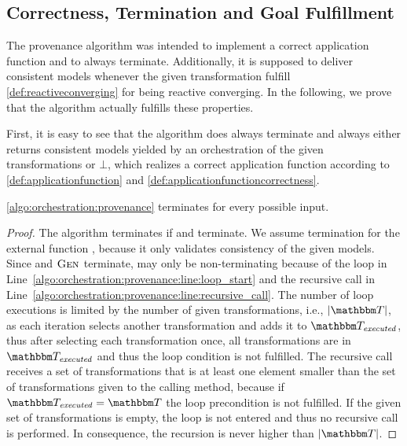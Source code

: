 \subsection{Correctness, Termination and Goal Fulfillment}

The provenance algorithm was intended to implement a correct application function and to always terminate.
Additionally, it is supposed to deliver consistent models whenever the given transformation fulfill \autoref{def:reactiveconverging} for being reactive converging.
In the following, we prove that the algorithm actually fulfills these properties.

First, it is easy to see that the algorithm does always terminate and always either returns consistent models yielded by an orchestration of the given transformations or $\bot$, which realizes a correct application function according to \autoref{def:applicationfunction} and \autoref{def:applicationfunctioncorrectness}.

\begin{theorem}
    \autoref{algo:orchestration:provenance} terminates for every possible input.
\end{theorem}
\begin{proof}
    The algorithm terminates if  and  terminate.
    We assume termination for the external function , because it only validates consistency of the given models.
    Since  and $\textsc{Gen}_{}$ terminate,  may only be non-terminating because of the loop in Line~\ref{algo:orchestration:provenance:line:loop_start} and the recursive call in Line~\ref{algo:orchestration:provenance:line:recursive_call}.
    The number of loop executions is limited by the number of given transformations, i.e., $\abs{\transformationset{T}}$, as each iteration selects another transformation and adds it to $\provalgexecuted$, thus after selecting each transformation once, all transformations are in $\provalgexecuted$ and thus the loop condition is not fulfilled.
    The recursive call receives a set of transformations that is at least one element smaller than the set of transformations given to the calling method, because if $\provalgexecuted = \transformationset{T}$ the loop precondition is not fulfilled. If the given set of transformations is empty, the loop is not entered and thus no recursive call is performed. In consequence, the recursion is never higher than $\abs{\transformationset{T}}$.
\end{proof}

